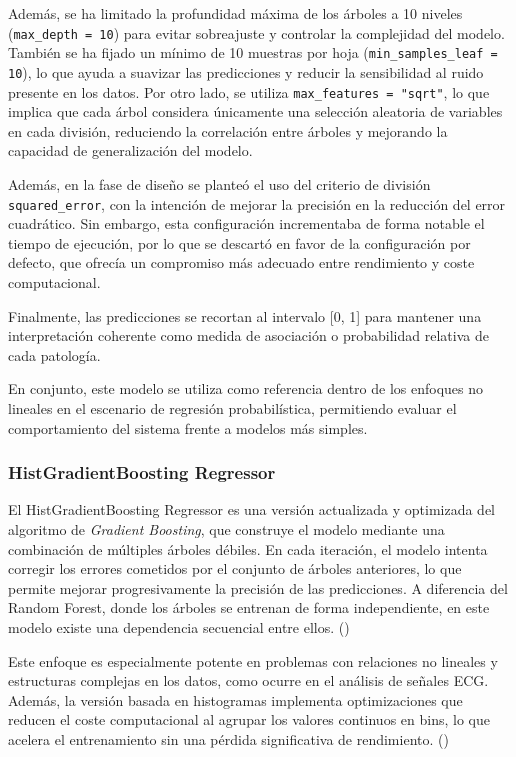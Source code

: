 \documentclass[12pt,a4paper,twoside]{book}
\begin{document}
Además, se ha limitado la profundidad máxima de los árboles a 10 niveles (\texttt{max\_depth = 10}) para evitar sobreajuste y controlar la complejidad del modelo. 
También se ha fijado un mínimo de 10 muestras por hoja (\texttt{min\_samples\_leaf = 10}), lo que ayuda a suavizar las predicciones y reducir la sensibilidad al ruido presente en los datos. 
Por otro lado, se utiliza \texttt{max\_features = "sqrt"}, lo que implica que cada árbol considera únicamente una selección aleatoria de variables en cada división, reduciendo la correlación entre árboles y mejorando la capacidad de generalización del modelo.

Además, en la fase de diseño se planteó el uso del criterio de división \texttt{squared\_error}, con la intención de mejorar la precisión en la reducción del error cuadrático. 
Sin embargo, esta configuración incrementaba de forma notable el tiempo de ejecución, por lo que se descartó en favor de la configuración por defecto, que ofrecía un compromiso más adecuado entre rendimiento y coste computacional.

Finalmente, las predicciones se recortan al intervalo [0, 1] para mantener una interpretación coherente como medida de asociación o probabilidad relativa de cada patología.

En conjunto, este modelo se utiliza como referencia dentro de los enfoques no lineales en el escenario de regresión probabilística, permitiendo evaluar el comportamiento del sistema frente a modelos más simples.

\subsubsection*{HistGradientBoosting Regressor}

El HistGradientBoosting Regressor es una versión actualizada y optimizada del algoritmo de \textit{Gradient Boosting}, que construye el modelo mediante una combinación de múltiples árboles débiles.
En cada iteración, el modelo intenta corregir los errores cometidos por el conjunto de árboles anteriores, lo que permite mejorar progresivamente la precisión de las predicciones.
A diferencia del Random Forest, donde los árboles se entrenan de forma independiente, en este modelo existe una dependencia secuencial entre ellos. (\cite{picard2024_hist_gbr})

Este enfoque es especialmente potente en problemas con relaciones no lineales y estructuras complejas en los datos, como ocurre en el análisis de señales ECG. 
Además, la versión basada en histogramas implementa optimizaciones que reducen el coste computacional al agrupar los valores continuos en bins, lo que acelera el entrenamiento sin una pérdida significativa de rendimiento. (\cite{riaux2024_histgbm})
\end{document}
